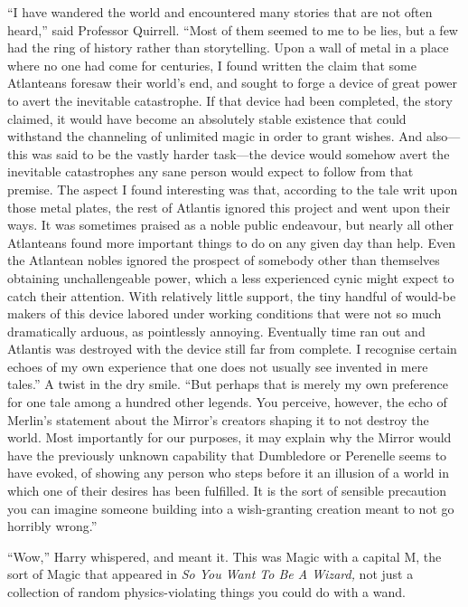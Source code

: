 “I have wandered the world and encountered many stories that are not often
heard,” said Professor Quirrell. “Most of them seemed to me to be lies, but a
few had the ring of history rather than storytelling. Upon a wall of metal in a
place where no one had come for centuries, I found written the claim that some
Atlanteans foresaw their world’s end, and sought to forge a device of great
power to avert the inevitable catastrophe. If that device had been completed,
the story claimed, it would have become an absolutely stable existence that
could withstand the channeling of unlimited magic in order to grant wishes. And
also—this was said to be the vastly harder task—the device would somehow
avert the inevitable catastrophes any sane person would expect to follow from
that premise. The aspect I found interesting was that, according to the tale
writ upon those metal plates, the rest of Atlantis ignored this project and
went upon their ways. It was sometimes praised as a noble public endeavour, but
nearly all other Atlanteans found more important things to do on any given day
than help. Even the Atlantean nobles ignored the prospect of somebody other
than themselves obtaining unchallengeable power, which a less experienced cynic
might expect to catch their attention. With relatively little support, the tiny
handful of would-be makers of this device labored under working conditions that
were not so much dramatically arduous, as pointlessly annoying. Eventually time
ran out and Atlantis was destroyed with the device still far from complete. I
recognise certain echoes of my own experience that one does not usually see
invented in mere tales.” A twist in the dry smile. “But perhaps that is merely
my own preference for one tale among a hundred other legends. You perceive,
however, the echo of Merlin’s statement about the Mirror’s creators shaping it
to not destroy the world. Most importantly for our purposes, it may explain why
the Mirror would have the previously unknown capability that Dumbledore or
Perenelle seems to have evoked, of showing any person who steps before it an
illusion of a world in which one of their desires has been fulfilled. It is the
sort of sensible precaution you can imagine someone building into a
wish-granting creation meant to not go horribly wrong.”

“Wow,” Harry whispered, and meant it. This was Magic with a capital M, the sort
of Magic that appeared in \emph{So You Want To Be A Wizard,} not just a
collection of random physics-violating things you could do with a wand.

